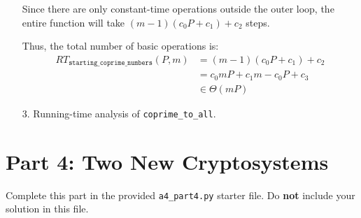 \documentclass[fontsize=11pt]{article}
\newcommand{\code}[1]{\texttt{#1}}
\begin{document}
\begin{enumerate}
Since there are only constant-time operations outside the outer loop, the entire function will take $(m - 1)(c_0P + c_1) + c_2$ steps.

Thus, the total number of basic operations is:
\begin{align}
RT_{\code{starting\_coprime\_numbers}}(P, m) &= (m - 1)(c_0P + c_1) + c_2 \\
& = c_0mP + c_1m - c_0P + c_3 \\
& \in \Theta(mP)
\end{align}

\item[3.]
Running-time analysis of \texttt{coprime\_to\_all}.
\end{enumerate}

\section*{Part 4: Two New Cryptosystems}

Complete this part in the provided \texttt{a4\_part4.py} starter file.
Do \textbf{not} include your solution in this file.
\end{document}
